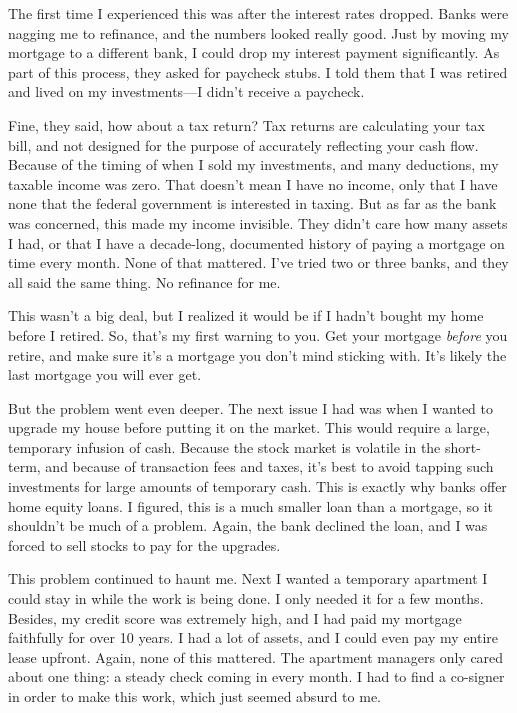 The first time I experienced this was after the interest rates dropped. Banks were nagging me to refinance, and the numbers looked really good. Just by moving my mortgage to a different bank, I could drop my interest payment significantly. As part of this process, they asked for paycheck stubs. I told them that I was retired and lived on my investments---I didn't receive a paycheck.

Fine, they said, how about a tax return? Tax returns are calculating your tax bill, and not designed for the purpose of accurately reflecting your cash flow. Because of the timing of when I sold my investments, and many deductions, my taxable income was zero. That doesn't mean I have no income, only that I have none that the federal government is interested in taxing. But as far as the bank was concerned, this made my income invisible. They didn't care how many assets I had, or that I have a decade-long, documented history of paying a mortgage on time every month. None of that mattered. I've tried two or three banks, and they all said the same thing. No refinance for me.

This wasn't a big deal, but I realized it would be if I hadn't bought my home before I retired. So, that's my first warning to you. Get your mortgage \emph{before} you retire, and make sure it's a mortgage you don't mind sticking with. It's likely the last mortgage you will ever get.

But the problem went even deeper. The next issue I had was when I wanted to upgrade my house before putting it on the market. This would require a large, temporary infusion of cash. Because the stock market is volatile in the short-term, and because of transaction fees and taxes, it's best to avoid tapping such investments for large amounts of temporary cash. This is exactly why banks offer home equity loans. I figured, this is a much smaller loan than a mortgage, so it shouldn't be much of a problem. Again, the bank declined the loan, and I was forced to sell stocks to pay for the upgrades.

This problem continued to haunt me. Next I wanted a temporary apartment I could stay in while the work is being done. I only needed it for a few months. Besides, my credit score was extremely high, and I had paid my mortgage faithfully for over 10 years. I had a lot of assets, and I could even pay my entire lease upfront. Again, none of this mattered. The apartment managers only cared about one thing: a steady check coming in every month. I had to find a co-signer in order to make this work, which just seemed absurd to me.

